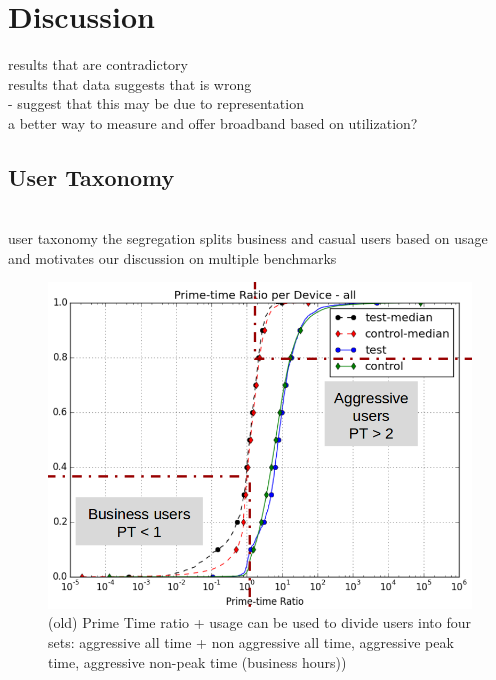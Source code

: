 \section{Discussion}
\label{sec:discussion}
results that are contradictory\\
results that data suggests that is wrong\\ 
- suggest that this may be due to representation\\
a better way to measure and offer broadband based on utilization?

\subsection{User Taxonomy}
\label{subsec:taxonomy}


\\

user taxonomy
 the segregation splits business and casual users based on usage and motivates our discussion on multiple benchmarks


\begin{figure}[t!]
\begin{minipage}{1\linewidth}
\centering
\includegraphics[width=\linewidth]{figures/cdf-prime-time-ratio[replace].png}
\caption{(old) Prime Time ratio + usage can be used to divide users into four sets: aggressive all time + non aggressive all time, aggressive peak time, aggressive non-peak time (business hours))}
\label{fig:CDF-prime-time-ratio}
\end{minipage}
\end{figure}





